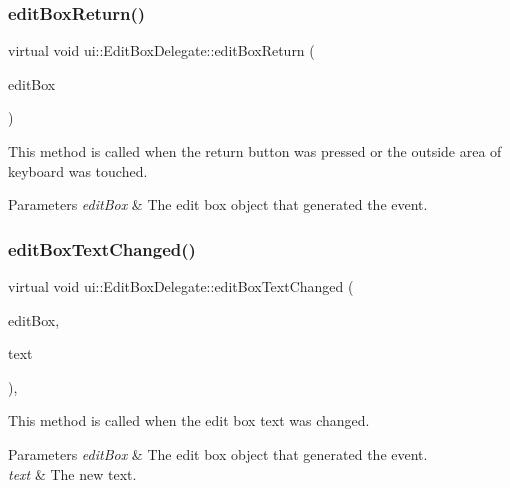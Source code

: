 \subsubsection{\texorpdfstring{edit\+Box\+Return()}{editBoxReturn()}\hspace{0.1cm}{\footnotesize\ttfamily [2/2]}}
{\footnotesize\ttfamily virtual void ui\+::\+Edit\+Box\+Delegate\+::edit\+Box\+Return (\begin{DoxyParamCaption}\item[{\hyperlink{classui_1_1EditBox}{Edit\+Box} $\ast$}]{edit\+Box }\end{DoxyParamCaption})\hspace{0.3cm}{\ttfamily [pure virtual]}}

This method is called when the return button was pressed or the outside area of keyboard was touched. 
\begin{DoxyParams}{Parameters}
{\em edit\+Box} & The edit box object that generated the event. \\
\hline
\end{DoxyParams}
\mbox{\label{classui_1_1EditBoxDelegate_af58ec2338b2250abcb129c584ba424fb}} 
\subsubsection{\texorpdfstring{edit\+Box\+Text\+Changed()}{editBoxTextChanged()}\hspace{0.1cm}{\footnotesize\ttfamily [1/2]}}
{\footnotesize\ttfamily virtual void ui\+::\+Edit\+Box\+Delegate\+::edit\+Box\+Text\+Changed (\begin{DoxyParamCaption}\item[{\hyperlink{classui_1_1EditBox}{Edit\+Box} $\ast$}]{edit\+Box,  }\item[{const std\+::string \&}]{text }\end{DoxyParamCaption})\hspace{0.3cm}{\ttfamily [inline]}, {\ttfamily [virtual]}}

This method is called when the edit box text was changed. 
\begin{DoxyParams}{Parameters}
{\em edit\+Box} & The edit box object that generated the event. \\
\hline
{\em text} & The new text. \\
\hline
\end{DoxyParams}
\mbox{\label{classui_1_1EditBoxDelegate_ac98e63e402ea39fc74cfb0dd33a132ab}} 

